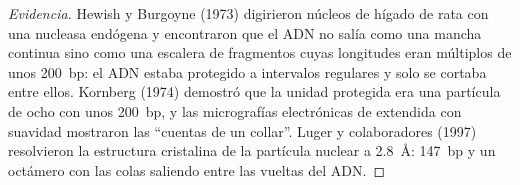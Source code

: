\begin{proof}[Evidencia]
Hewish y Burgoyne (1973) digirieron núcleos de hígado de rata con una
nucleasa endógena y encontraron que el ADN no salía como una mancha
continua sino como una escalera de fragmentos cuyas longitudes eran
múltiplos de unos \qty{200}{bp}: el ADN estaba protegido a intervalos
regulares y solo se cortaba entre ellos. Kornberg (1974) demostró que la
unidad protegida era una partícula de ocho  con unos
\qty{200}{bp}, y las micrografías electrónicas de  extendida con
suavidad mostraron las ``cuentas de un collar''. Luger y colaboradores
(1997) resolvieron la estructura cristalina de la partícula nuclear a
\qty{2.8}{\angstrom}: \qty{147}{bp} y un octámero con las colas saliendo
entre las vueltas del ADN.
\end{proof}

